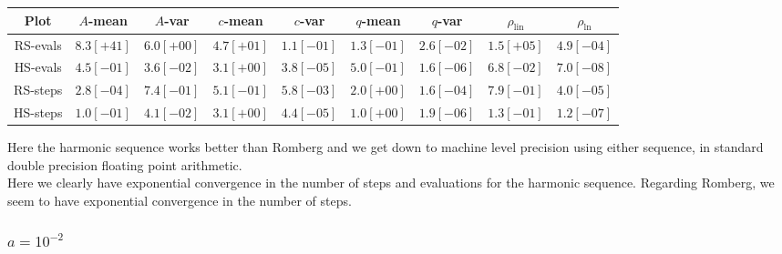 \begin{table}[H]
    \centering
    \small
    \begin{tabular}{c||c|c|c|c|c|c|c|c}
Plot & \(A\)-mean & \(A\)-var & \(c\)-mean & \(c\)-var & \(q\)-mean & \(q\)-var & \(\rho_{\operatorname{lin}}\) & \(\rho_{\ln}\)\\\hline
\rowcolor{red}
RS-evals & \(8.3[+41]\) & \(6.0[+00]\) & \(4.7[+01]\) & \(1.1[-01]\) & \(1.3[-01]\) & \(2.6[-02]\) & \(1.5[+05]\) & \(4.9[-04]\) \\
\rowcolor{green}
HS-evals & \(4.5[-01]\) & \(3.6[-02]\) & \(3.1[+00]\) & \(3.8[-05]\) & \(5.0[-01]\) & \(1.6[-06]\) & \(6.8[-02]\) & \(7.0[-08]\) \\
\rowcolor{green}
RS-steps & \(2.8[-04]\) & \(7.4[-01]\) & \(5.1[-01]\) & \(5.8[-03]\) & \(2.0[+00]\) & \(1.6[-04]\) & \(7.9[-01]\) & \(4.0[-05]\) \\
\rowcolor{green}
HS-steps & \(1.0[-01]\) & \(4.1[-02]\) & \(3.1[+00]\) & \(4.4[-05]\) & \(1.0[+00]\) & \(1.9[-06]\) & \(1.3[-01]\) & \(1.2[-07]\) \\
    \end{tabular}
    \label{tab:my_label}
\end{table}

Here the harmonic sequence works better than Romberg and we get down to machine level precision using either sequence, in standard double precision floating point arithmetic.\\

Here we clearly have exponential convergence in the number of steps and evaluations for the harmonic sequence. Regarding Romberg, we seem to have exponential convergence in the number of steps.

\subsubsection{\(a = 10^{-2}\)}

